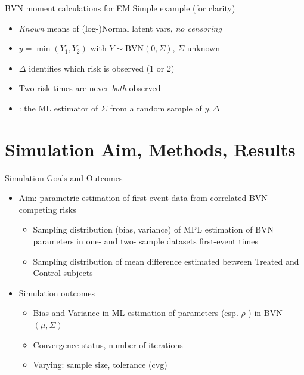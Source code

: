 \documentclass[10pt]{beamer}
\providecommand{\tightlist}{%
\setlength{\itemsep}{0pt}\setlength{\parskip}{0pt}}
\begin{document}
\begin{frame}{BVN moment calculations for EM}
Simple example (for clarity)

\begin{itemize}
\item
  \emph{Known} means of (log-)Normal latent vars, \emph{no censoring}
\item
  \(y=\min(Y_1,Y_2)\) with \(Y \sim \text{BVN}(0, \Sigma)\), \(\Sigma\)
  unknown
\item
  \(\Delta\) identifies which risk is observed (1 or 2)
\item
  Two risk times are never \emph{both} observed
\item
  {\color{orange}{Goal}}: the ML estimator of \(\Sigma\) from a random sample of
  \(y, \Delta\)
\end{itemize}
\end{frame}


\section{Simulation Aim, Methods, Results}

\begin{frame}{Simulation Goals and Outcomes}
\begin{itemize}
\item
  \alert{Aim:} parametric estimation of \alert{first-event data} from correlated
  BVN competing risks

  \begin{itemize}
  \tightlist
  \item
    Sampling distribution (\alert{bias, variance}) of MPL estimation of
    BVN parameters in one- and two- sample datasets  first-event times
  \item
    Sampling distribution of mean difference estimated between Treated
    and Control subjects
  \end{itemize}

\item Simulation outcomes
  \begin{itemize}
  \tightlist
  \item Bias and Variance in ML estimation of parameters (esp. \( \rho \) ) in BVN\( (\mu,\Sigma) \)
  \item Convergence status, number of iterations
  \item Varying: sample size, tolerance (cvg)
  \end{itemize}
\end{itemize}
\end{frame}
\end{document}
